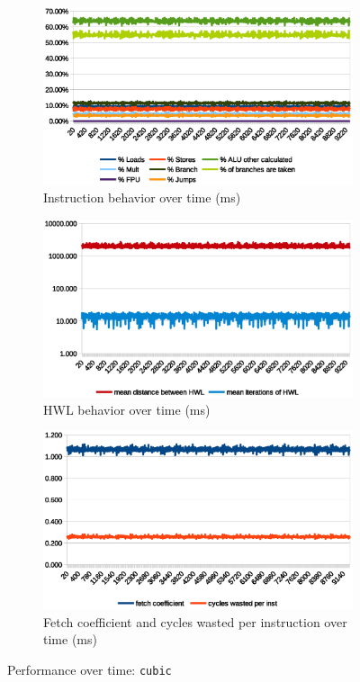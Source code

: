\documentclass[../bachelor_paper.tex]{subfiles}
\begin{document}
\begin{figure}
    \begin{subfigure}{0.45\textwidth}
        \includegraphics[width=\textwidth]{img/graph/embench/cubic_inst.eps}
        \caption{Instruction behavior over time (ms)}
    \end{subfigure}
    \begin{subfigure}{0.45\textwidth}
        \includegraphics[width=\textwidth]{img/graph/embench/cubic_hwl.eps}
        \caption{\ac{HWL} behavior over time (ms)}
    \end{subfigure}
    \begin{subfigure}{0.45\textwidth}
        \includegraphics[width=\textwidth]{img/graph/embench/cubic_fetch_waste.eps}
        \caption{Fetch coefficient and cycles wasted per instruction over time (ms)}
    \end{subfigure}
    \caption{Performance over time: \texttt{cubic}}
\end{figure}
\end{document}
